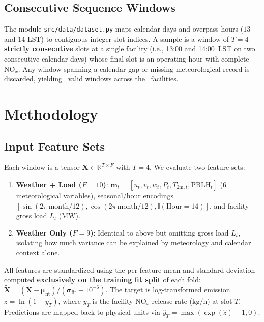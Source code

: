 \documentclass[conference]{IEEEtran}
\begin{document}
\subsection{Consecutive Sequence Windows}
The module \texttt{src/data/dataset.py} maps calendar days and overpass hours ($13$ and $14\text{ LST}$) to contiguous integer slot indices. A sample is a window of $T = 4$ \textbf{strictly consecutive} slots at a single facility (i.e., 13:00 and 14:00~LST on two consecutive calendar days) whose final slot is an operating hour with complete $\text{NO}_x$. Any window spanning a calendar gap or missing meteorological record is discarded, yielding \NWindows~valid windows across the \NFacilities~facilities.

\section{Methodology}
\label{sec:method}

\subsection{Input Feature Sets}
Each window is a tensor $\mathbf{X} \in \mathbb{R}^{T \times F}$ with $T = 4$. We evaluate two feature sets:
\begin{enumerate}
    \item \textbf{Weather + Load ($F = 10$)}: $\mathbf{m}_t = [u_t, v_t, w_t, P_t, T_{2\text{m},t}, \text{PBLH}_t]$ (6 meteorological variables), seasonal/hour encodings $[\sin(2\pi\,\text{month}/12), \cos(2\pi\,\text{month}/12), \mathbb{I}(\text{Hour}=14)]$, and facility gross load $L_t$ ($\text{MW}$).
    \item \textbf{Weather Only ($F = 9$)}: Identical to above but omitting gross load $L_t$, isolating how much variance can be explained by meteorology and calendar context alone.
\end{enumerate}
All features are standardized using the per-feature mean and standard deviation computed \textbf{exclusively on the training fit split} of each fold: $\tilde{\mathbf{X}} = (\mathbf{X} - \boldsymbol{\mu}_{\text{fit}}) / (\boldsymbol{\sigma}_{\text{fit}} + 10^{-6})$. The target is log-transformed emission $z = \ln(1 + y_T)$, where $y_T$ is the facility $\text{NO}_x$ release rate ($\text{kg/h}$) at slot $T$. Predictions are mapped back to physical units via $\hat{y}_T = \max(\exp(\hat{z}) - 1, 0)$.
\end{document}
